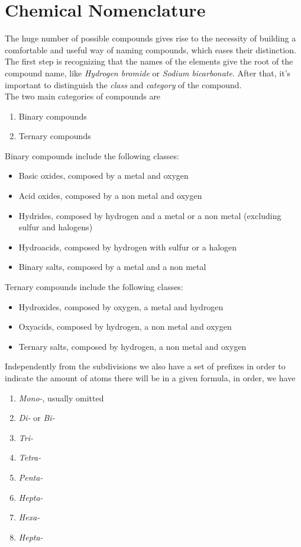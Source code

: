 \documentclass[../qm.tex]{subfiles}
\begin{document}
\section{Chemical Nomenclature}
The huge number of possible compounds gives rise to the necessity of building a comfortable and useful way of naming compounds, which eases their distinction.\\
The first step is recognizing that the names of the elements give the root of the compound name, like \textit{Hydrogen bromide} or \textit{Sodium bicarbonate}. After that, it's important to distinguish the \textit{class} and \textit{category} of the compound.\\
The two main categories of compounds are
\begin{enumerate}
\item Binary compounds
\item Ternary compounds
\end{enumerate}
Binary compounds include the following classes:
\begin{itemize}
\item Basic oxides, composed by a metal and oxygen
\item Acid oxides, composed by a non metal and oxygen
\item Hydrides, composed by hydrogen and a metal or a non metal (excluding sulfur and halogens)
\item Hydroacids, composed by hydrogen with sulfur or a halogen
\item Binary salts, composed by a metal and a non metal
\end{itemize}
Ternary compounds include the following classes:
\begin{itemize}
\item Hydroxides, composed by oxygen, a metal and hydrogen
\item Oxyacids, composed by hydrogen, a non metal and oxygen
\item Ternary salts, composed by hydrogen, a non metal and oxygen
\end{itemize}
Independently from the subdivisions we also have a set of prefixes in order to indicate the amount of atoms there will be in a given formula, in order, we have
\begin{enumerate}
\item \textit{Mono-}, usually omitted
\item \textit{Di-} or \textit{Bi-}
\item \textit{Tri-}
\item \textit{Tetra-}
\item \textit{Penta-}
\item \textit{Hepta-}
\item \textit{Hexa-}
\item \textit{Hepta-}
\end{enumerate}
\end{document}
